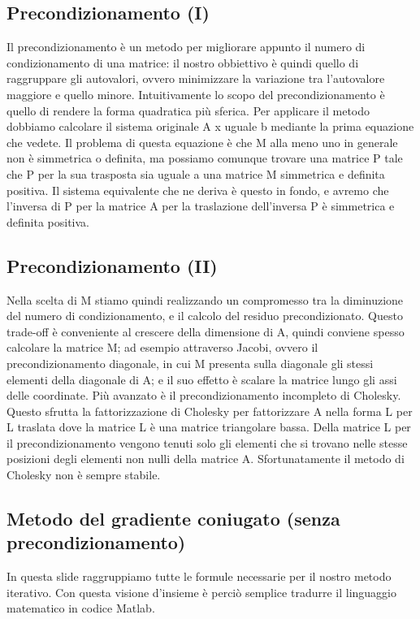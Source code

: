\documentclass[a4paper]{article}
\begin{document}
\subsection*{Precondizionamento (I)}
Il precondizionamento è un metodo per migliorare appunto il numero di condizionamento di una matrice: il nostro obbiettivo è quindi quello di raggruppare gli autovalori, ovvero minimizzare la variazione tra l’autovalore maggiore e quello minore.
Intuitivamente lo scopo del precondizionamento è quello di rendere la forma quadratica più sferica.
Per applicare il metodo dobbiamo calcolare il sistema originale A x uguale b mediante la prima equazione che vedete.
Il problema di questa equazione è che M alla meno uno in generale non è simmetrica o definita, ma possiamo comunque trovare una matrice P tale che P per la sua trasposta sia uguale a una matrice M simmetrica e definita positiva.
Il sistema equivalente che ne deriva è questo in fondo, e avremo che l’inversa di P per la matrice A per la traslazione dell’inversa P è simmetrica e definita positiva.

\subsection*{Precondizionamento (II)}
Nella scelta di M stiamo quindi realizzando un compromesso tra la diminuzione del numero di condizionamento, e il calcolo del residuo precondizionato.
Questo trade-off è conveniente al crescere della dimensione di A, quindi conviene spesso calcolare la matrice M; ad esempio attraverso Jacobi, ovvero il precondizionamento diagonale, in cui M presenta sulla diagonale gli stessi elementi della diagonale di A; e il suo effetto è scalare la matrice lungo gli assi delle coordinate.
Più avanzato  è il precondizionamento incompleto di Cholesky. Questo sfrutta la fattorizzazione di Cholesky per fattorizzare A nella forma L per L traslata dove la matrice L è una matrice triangolare bassa. 
Della matrice L per il precondizionamento vengono tenuti solo gli elementi che si trovano nelle stesse posizioni degli elementi non  nulli della matrice A.
Sfortunatamente il metodo di Cholesky non è sempre stabile.

\subsection*{Metodo del gradiente coniugato (senza precondizionamento)}
In questa slide raggruppiamo tutte le formule necessarie per il nostro metodo iterativo.
Con questa visione d’insieme è perciò semplice tradurre il linguaggio matematico in codice Matlab.
\end{document}
